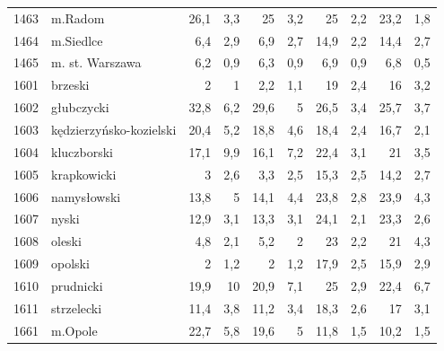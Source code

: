 \begin{center}
\begin{longtable}{lp{3cm}rrrrrrrr}
1463 & m.Radom                 & 26,1    & 3,3         & 25       & 3,2          & 25       & 2,2          & 23,2     & 1,8          \\
1464 & m.Siedlce               & 6,4     & 2,9         & 6,9      & 2,7          & 14,9     & 2,2          & 14,4     & 2,7          \\
1465 & m. st. Warszawa         & 6,2     & 0,9         & 6,3      & 0,9          & 6,9      & 0,9          & 6,8      & 0,5          \\
1601 & brzeski                 & 2       & 1           & 2,2      & 1,1          & 19       & 2,4          & 16       & 3,2          \\
1602 & głubczycki              & 32,8    & 6,2         & 29,6     & 5            & 26,5     & 3,4          & 25,7     & 3,7          \\
1603 & kędzierzyńsko-kozielski & 20,4    & 5,2         & 18,8     & 4,6          & 18,4     & 2,4          & 16,7     & 2,1          \\
1604 & kluczborski             & 17,1    & 9,9         & 16,1     & 7,2          & 22,4     & 3,1          & 21       & 3,5          \\
1605 & krapkowicki             & 3       & 2,6         & 3,3      & 2,5          & 15,3     & 2,5          & 14,2     & 2,7          \\
1606 & namysłowski             & 13,8    & 5           & 14,1     & 4,4          & 23,8     & 2,8          & 23,9     & 4,3          \\
1607 & nyski                   & 12,9    & 3,1         & 13,3     & 3,1          & 24,1     & 2,1          & 23,3     & 2,6          \\
1608 & oleski                  & 4,8     & 2,1         & 5,2      & 2            & 23       & 2,2          & 21       & 4,3          \\
1609 & opolski                 & 2       & 1,2         & 2        & 1,2          & 17,9     & 2,5          & 15,9     & 2,9          \\
1610 & prudnicki               & 19,9    & 10          & 20,9     & 7,1          & 25       & 2,9          & 22,4     & 6,7          \\
1611 & strzelecki              & 11,4    & 3,8         & 11,2     & 3,4          & 18,3     & 2,6          & 17       & 3,1          \\
1661 & m.Opole                 & 22,7    & 5,8         & 19,6     & 5            & 11,8     & 1,5          & 10,2     & 1,5          \\

\end{longtable}
\end{center}
